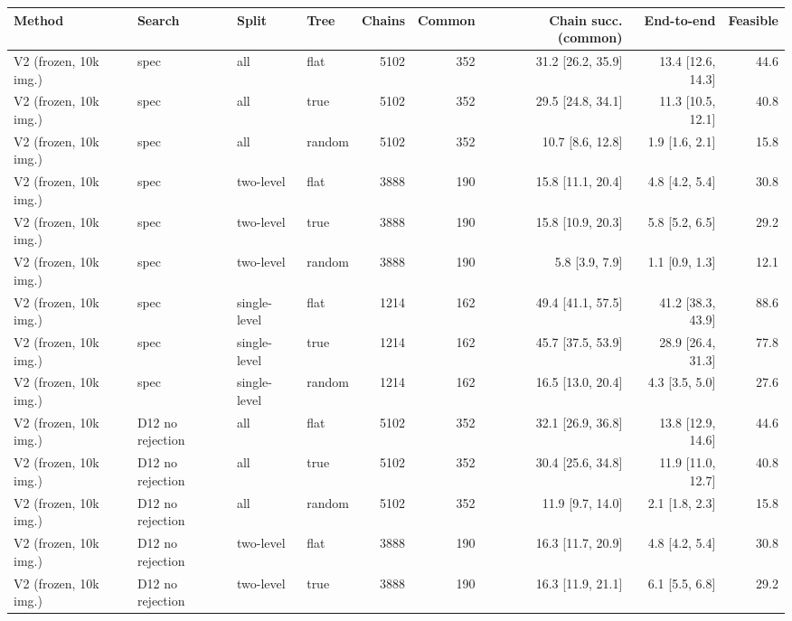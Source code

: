 \begin{tabular}{llllrrrrr}
\toprule
Method & Search & Split & Tree & Chains & Common & Chain succ. (common) & End-to-end & Feasible \\
\midrule
V2 (frozen, 10k img.) & spec & all & flat & 5102 & 352 & 31.2 \scriptsize{[26.2, 35.9]} & 13.4 \scriptsize{[12.6, 14.3]} & 44.6 \\
V2 (frozen, 10k img.) & spec & all & true & 5102 & 352 & 29.5 \scriptsize{[24.8, 34.1]} & 11.3 \scriptsize{[10.5, 12.1]} & 40.8 \\
V2 (frozen, 10k img.) & spec & all & random & 5102 & 352 & 10.7 \scriptsize{[8.6, 12.8]} & 1.9 \scriptsize{[1.6, 2.1]} & 15.8 \\
V2 (frozen, 10k img.) & spec & two-level & flat & 3888 & 190 & 15.8 \scriptsize{[11.1, 20.4]} & 4.8 \scriptsize{[4.2, 5.4]} & 30.8 \\
V2 (frozen, 10k img.) & spec & two-level & true & 3888 & 190 & 15.8 \scriptsize{[10.9, 20.3]} & 5.8 \scriptsize{[5.2, 6.5]} & 29.2 \\
V2 (frozen, 10k img.) & spec & two-level & random & 3888 & 190 & 5.8 \scriptsize{[3.9, 7.9]} & 1.1 \scriptsize{[0.9, 1.3]} & 12.1 \\
V2 (frozen, 10k img.) & spec & single-level & flat & 1214 & 162 & 49.4 \scriptsize{[41.1, 57.5]} & 41.2 \scriptsize{[38.3, 43.9]} & 88.6 \\
V2 (frozen, 10k img.) & spec & single-level & true & 1214 & 162 & 45.7 \scriptsize{[37.5, 53.9]} & 28.9 \scriptsize{[26.4, 31.3]} & 77.8 \\
V2 (frozen, 10k img.) & spec & single-level & random & 1214 & 162 & 16.5 \scriptsize{[13.0, 20.4]} & 4.3 \scriptsize{[3.5, 5.0]} & 27.6 \\
\midrule
V2 (frozen, 10k img.) & D12 no rejection & all & flat & 5102 & 352 & 32.1 \scriptsize{[26.9, 36.8]} & 13.8 \scriptsize{[12.9, 14.6]} & 44.6 \\
V2 (frozen, 10k img.) & D12 no rejection & all & true & 5102 & 352 & 30.4 \scriptsize{[25.6, 34.8]} & 11.9 \scriptsize{[11.0, 12.7]} & 40.8 \\
V2 (frozen, 10k img.) & D12 no rejection & all & random & 5102 & 352 & 11.9 \scriptsize{[9.7, 14.0]} & 2.1 \scriptsize{[1.8, 2.3]} & 15.8 \\
V2 (frozen, 10k img.) & D12 no rejection & two-level & flat & 3888 & 190 & 16.3 \scriptsize{[11.7, 20.9]} & 4.8 \scriptsize{[4.2, 5.4]} & 30.8 \\
V2 (frozen, 10k img.) & D12 no rejection & two-level & true & 3888 & 190 & 16.3 \scriptsize{[11.9, 21.1]} & 6.1 \scriptsize{[5.5, 6.8]} & 29.2 \\

\end{tabular}
